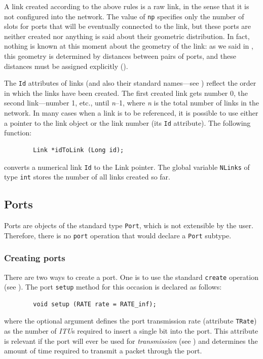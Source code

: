 A link created according to the above rules is a raw link, in the sense that
it is not configured into the network.
The value of {\tt np} specifies only the number of slots for ports that
will be eventually connected to the link,
but these ports are neither created nor anything is said
about their geometric distribution.
In fact, nothing is known at this moment
about the geometry of the link: as we said
in , this geometry is determined by distances
between pairs of ports, and these distances must be assigned
explicitly ().

The {\tt Id} attributes of links (and also their standard names---see
) reflect the order in which the links have been created.
The first created link gets number 0, the second link---number 1, etc., until
{\em n\/}--1, where {\em n\/} is the total number of links in the network.
In many cases when a link is to be referenced, it is possible to use either
a pointer to the link object or the link number (its {\tt Id} attribute).
The following function:
\begin{verbatim}
        Link *idToLink (Long id);
\end{verbatim}
converts a numerical link {\tt Id} to the Link pointer.
The global variable {\tt NLinks} of type {\tt int} stores the number of
all links created so far.

\subsection{Ports}
\label{rm_to_po}

Ports are objects of the
standard type {\tt Port}, which is not extensible by the user.
Therefore, there is no {\tt port} operation that would declare a {\tt Port}
subtype.

\subsubsection{Creating ports}
\label{rm_to_po_cr}

There are two ways to create a port.
One is to use the standard {\tt create} operation
(see ).
The port {\tt setup} method for this occasion is declared as follows:
\begin{verbatim}
        void setup (RATE rate = RATE_inf);
\end{verbatim}
where the optional argument defines the port transmission rate (attribute
{\tt TRate}) as the
number of {\em ITU\/}s required to insert a single bit into the port.
This attribute is relevant if the port will ever
be used for {\em transmission\/}
(see ) and determines the amount of time
required to transmit a packet through the port.

